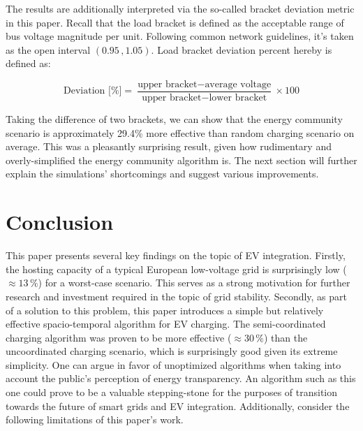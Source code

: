 \documentclass[a4paper,10pt]{report}
\begin{document}
The results are additionally interpreted via the so-called bracket deviation metric in this paper. Recall that the load bracket is defined as the acceptable range of bus voltage magnitude per unit. Following common network guidelines, it's taken as the open interval $(0.95\,, 1.05)$. Load bracket deviation percent hereby is defined as:

\begin{equation}
	\text{Deviation [\%]} = \frac{\text{upper bracket} - \text{average voltage}}{\text{upper bracket}-\text{lower bracket}}\times 100
\end{equation}

Taking the difference of two brackets, we can show that the energy community scenario is approximately 29.4\% more effective than random charging scenario on average. This was a pleasantly surprising result, given how rudimentary and overly-simplified the energy community algorithm is. The next section will further explain the simulations' shortcomings and suggest various improvements.


\chapter{Conclusion}\label{section_improvements}
This paper presents several key findings on the topic of EV integration. Firstly, the hosting capacity of a typical European low-voltage grid is surprisingly low ($\approx13\,\%$) for a worst-case scenario. This serves as a strong motivation for further research and investment required in the topic of grid stability. Secondly, as part of a solution to this problem, this paper introduces a simple but relatively effective spacio-temporal algorithm for EV charging. The semi-coordinated charging algorithm was proven to be more effective ($\approx30\,\%$) than the uncoordinated charging scenario, which is surprisingly good given its extreme simplicity. One can argue in favor of unoptimized algorithms when taking into account the public's perception of energy transparency. An algorithm such as this one could prove to be a valuable stepping-stone for the purposes of transition towards the future of smart grids and EV integration. Additionally, consider the following limitations of this paper's work.
\end{document}
